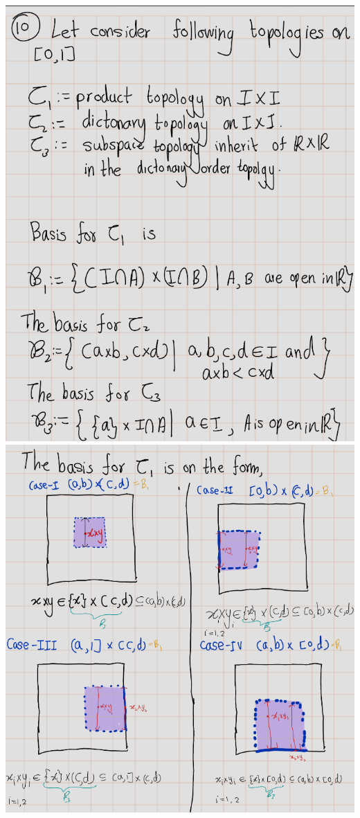\documentclass[
]{book}
\theoremstyle{definition}
\theoremstyle{definition}
\theoremstyle{definition}
\theoremstyle{definition}
\theoremstyle{remark}
\begin{document}
\includegraphics{figures/Exercises/Ex 2.16/ex-10-1.png}
\includegraphics{figures/Exercises/Ex 2.16/ex-10-2.png}
\end{document}
